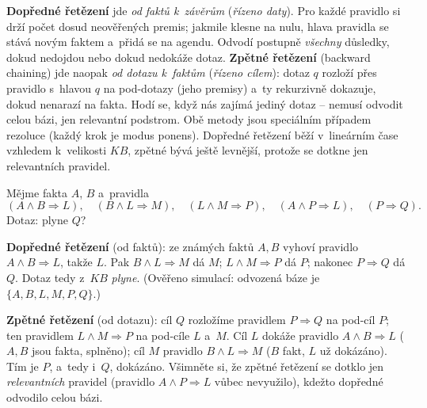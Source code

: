 \noindent \textbf{Dopředné řetězení} jde \emph{od faktů k~závěrům} (\emph{řízeno daty}). Pro každé pravidlo si drží počet dosud neověřených premis; jakmile klesne na nulu, hlava pravidla se stává novým faktem a~přidá se na agendu. Odvodí postupně \emph{všechny} důsledky, dokud nedojdou nebo dokud nedokáže dotaz. \textbf{Zpětné řetězení} (backward chaining) jde naopak \emph{od dotazu k~faktům} (\emph{řízeno cílem}): dotaz $q$ rozloží přes pravidlo s~hlavou $q$ na pod-dotazy (jeho premisy) a~ty rekurzivně dokazuje, dokud nenarazí na fakta. Hodí se, když nás zajímá jediný dotaz -- nemusí odvodit celou bázi, jen relevantní podstrom. Obě metody jsou speciálním případem rezoluce (každý krok je modus ponens). Dopředné řetězení běží v~lineárním čase vzhledem k~velikosti $KB$, zpětné bývá ještě levnější, protože se dotkne jen relevantních pravidel.

\begin{priklad}
Mějme fakta $A$, $B$ a~pravidla
\[ (A\wedge B\Rightarrow L),\quad (B\wedge L\Rightarrow M),\quad (L\wedge M\Rightarrow P),\quad (A\wedge P\Rightarrow L),\quad (P\Rightarrow Q). \]
Dotaz: plyne $Q$?

\textbf{Dopředné řetězení} (od faktů): ze známých faktů $A,B$ vyhoví pravidlo $A\wedge B\Rightarrow L$, takže $L$. Pak $B\wedge L\Rightarrow M$ dá $M$; $L\wedge M\Rightarrow P$ dá $P$; nakonec $P\Rightarrow Q$ dá $\boxed{Q}$. Dotaz tedy z~$KB$ \emph{plyne}. (Ověřeno simulací: odvozená báze je $\{A,B,L,M,P,Q\}$.)

\textbf{Zpětné řetězení} (od dotazu): cíl $Q$ rozložíme pravidlem $P\Rightarrow Q$ na pod-cíl $P$; ten pravidlem $L\wedge M\Rightarrow P$ na pod-cíle $L$ a~$M$. Cíl $L$ dokáže pravidlo $A\wedge B\Rightarrow L$ ($A,B$ jsou fakta, splněno); cíl $M$ pravidlo $B\wedge L\Rightarrow M$ ($B$ fakt, $L$ už dokázáno). Tím je $P$, a~tedy i~$\boxed{Q}$, dokázáno. Všimněte si, že zpětné řetězení se dotklo jen \emph{relevantních} pravidel (pravidlo $A\wedge P\Rightarrow L$ vůbec nevyužilo), kdežto dopředné odvodilo celou bázi.
\end{priklad}

